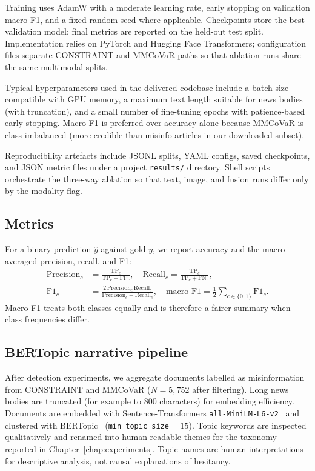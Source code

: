 \documentclass[12pt, a4paper]{report}
\begin{document}
Training uses AdamW with a moderate learning rate, early stopping on validation macro-F1, and a fixed random seed where applicable.
Checkpoints store the best validation model; final metrics are reported on the held-out test split.
Implementation relies on PyTorch and Hugging Face Transformers; configuration files separate CONSTRAINT and MMCoVaR paths so that ablation runs share the same multimodal splits.

Typical hyperparameters used in the delivered codebase include a batch size compatible with GPU memory, a maximum text length suitable for news bodies (with truncation), and a small number of fine-tuning epochs with patience-based early stopping.
Macro-F1 is preferred over accuracy alone because MMCoVaR is class-imbalanced (more credible than misinfo articles in our downloaded subset).

Reproducibility artefacts include JSONL splits, YAML configs, saved checkpoints, and JSON metric files under a project \texttt{results/} directory.
Shell scripts orchestrate the three-way ablation so that text, image, and fusion runs differ only by the modality flag.

\subsection{Metrics}

For a binary prediction $\hat{y}$ against gold $y$, we report accuracy and the macro-averaged precision, recall, and F1:
\begin{align}
\mathrm{Precision}_c &= \frac{\mathrm{TP}_c}{\mathrm{TP}_c+\mathrm{FP}_c}, \quad
\mathrm{Recall}_c = \frac{\mathrm{TP}_c}{\mathrm{TP}_c+\mathrm{FN}_c}, \\
\mathrm{F1}_c &= \frac{2\,\mathrm{Precision}_c\,\mathrm{Recall}_c}{\mathrm{Precision}_c+\mathrm{Recall}_c}, \quad
\mathrm{macro\text{-}F1} = \frac{1}{2}\sum_{c\in\{0,1\}} \mathrm{F1}_c.
\end{align}
Macro-F1 treats both classes equally and is therefore a fairer summary when class frequencies differ.

\subsection{BERTopic narrative pipeline}

After detection experiments, we aggregate documents labelled as misinformation from CONSTRAINT and MMCoVaR ($N=5{,}752$ after filtering).
Long news bodies are truncated (for example to $800$ characters) for embedding efficiency.
Documents are embedded with Sentence-Transformers \texttt{all-MiniLM-L6-v2}~\cite{reimers2019sentence} and clustered with BERTopic~\cite{grootendorst2022bertopic} (\texttt{min\_topic\_size}$=15$).
Topic keywords are inspected qualitatively and renamed into human-readable themes for the taxonomy reported in Chapter~\ref{chap:experiments}.
Topic names are human interpretations for descriptive analysis, not causal explanations of hesitancy.
\end{document}
